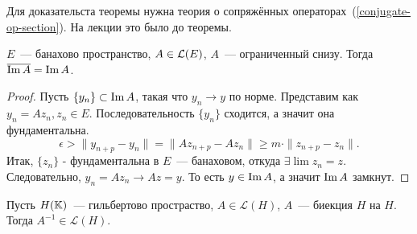 \begin{note}
    Для доказательста теоремы нужна теория о сопряжённых операторах~(\ref{conjugate-op-section}). На лекции это было до теоремы.
\end{note}

\begin{lemma}\label{8.4_lemma}
        $E$~--- банахово пространство,
        $A \in \mathcal{L}(E)$, $A$~--- ограниченный снизу. 
        Тогда $\overline{\operatorname{Im} A} = \operatorname{Im} A$.
\end{lemma}
\begin{proof}
    Пусть \(\left\{y_n \right\} \subset \operatorname{Im} A\), такая что \(y_n \rightarrow y\) по норме. Представим как $y_n = A z_n, z_n \in E$. Последовательность $\{y_n\}$ сходится, а значит она фундаментальна.
    \[ \epsilon > \|y_{n+p}-y_n\|=\|Az_{n+p}-Az_n\| \geq m \cdot \|z_{n+p} - z_n \|.\] 
    Итак, $\{z_n\}$ - фундаментальна в $E$~--- банаховом, откуда $\exists \lim z_n = z$. Следовательно, $y_n = A z_n \to A z = y$. То есть $y \in \operatorname{Im} A$, а значит $\operatorname{Im} A$ замкнут.
\end{proof}

\begin{theorem}\label{8.4}
     Пусть $H(\mathbb{K})$~--- гильбертово простраство, $A \in \mathcal{L}(H)$,
     $A$~--- биекция $H$ на $H$. Тогда $A^{-1} \in \mathcal{L}(H)$.
\end{theorem}

